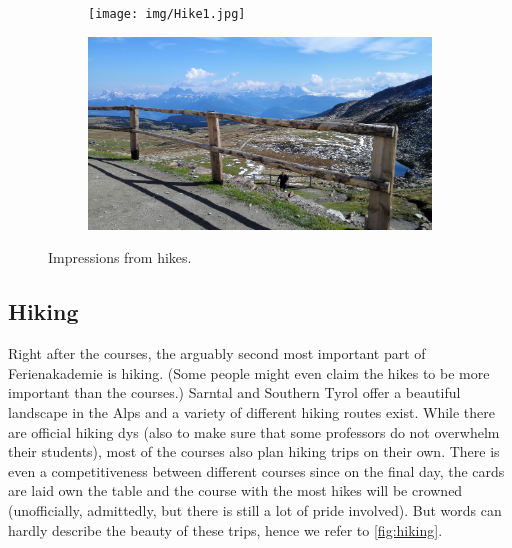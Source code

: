 \begin{figure}[ht]%
	\centering
    \begin{subfigure}[t]{0.5\textwidth}
 	\begin{center}%
 		\texttt{[image: img/Hike1.jpg]}%
 	\end{center}%
    \end{subfigure}%
    \begin{subfigure}[t]{0.5\textwidth}
 	\begin{center}%
 		\includegraphics[scale=0.05]{img/Hike2.jpg}%
 	\end{center}%
    \end{subfigure}
    \caption{Impressions from hikes.}
    \label{fig:hiking}
\end{figure}
\subsection{Hiking}
Right after the courses, the arguably second most important part of Ferienakademie is hiking. (Some people might even claim the hikes to be more important than the courses.) Sarntal and Southern Tyrol offer a beautiful landscape in the Alps and a variety of different hiking routes exist. While there are official hiking dys (also to make sure that some professors do not overwhelm their students), most of the courses also plan hiking trips on their own. There is even a competitiveness between different courses since on the final day, the cards are laid own the table and the course with the most hikes will be crowned (unofficially, admittedly, but there is still a lot of pride involved). But words can hardly describe the beauty of these trips, hence we refer to \autoref{fig:hiking}.

